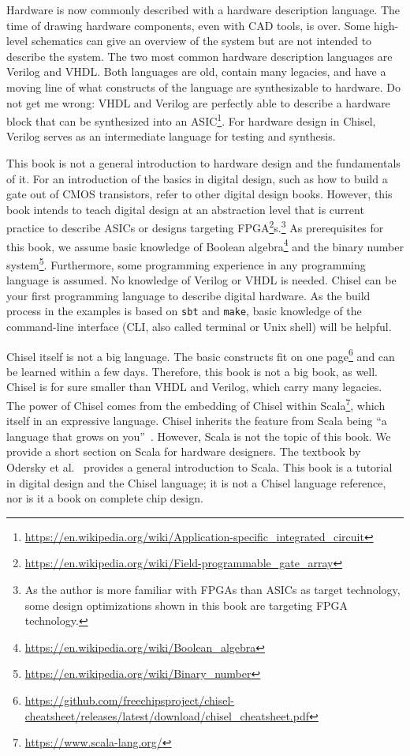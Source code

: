 \documentclass[%
    10pt,
    headinclude, footexclude,
    openright, %
    notitlepage,
    cleardoubleempty,
    headsepline,
    pointlessnumbers,
    bibtotoc, idxtotoc,
    ]{scrbook}
\newcommand{\code}[1]{{\small{\texttt{#1}}}}
\newcommand{\myref}[2]{\href{#1}{#2}}
\renewcommand{\myref}[2]{{#2}{\footnote{\url{#1}}}}
\begin{document}
Hardware is now commonly described with a hardware description language.
The time of drawing hardware components, even with CAD tools, is
over. Some high-level schematics can give an overview of the system but are
not intended to describe the system.
The two most common hardware description languages are Verilog and VHDL.
Both languages are old, contain many legacies, and have a moving line of what
constructs of the language are synthesizable to hardware.
Do not get me wrong: VHDL and Verilog are perfectly able to describe a hardware
block that can be synthesized into an
\myref{https://en.wikipedia.org/wiki/Application-specific_integrated_circuit}{ASIC}.
For hardware design in Chisel, Verilog serves as an intermediate language
for testing and synthesis.

This book is not a general introduction to hardware design and the fundamentals of it.
For an introduction of the basics in digital design, such as how to build a gate out of
CMOS transistors, refer to other digital design books.
However, this book intends to teach digital design at an abstraction level that is
current practice to describe ASICs or designs targeting
\myref{https://en.wikipedia.org/wiki/Field-programmable_gate_array}{FPGA}s.\footnote{As the author is more familiar with FPGAs
than ASICs as target technology, some design optimizations shown in this book are
targeting FPGA technology.}
As prerequisites for this book, we assume basic knowledge of
\myref{https://en.wikipedia.org/wiki/Boolean_algebra}{Boolean algebra} and the
\myref{https://en.wikipedia.org/wiki/Binary_number}{binary number system}.
Furthermore, some programming experience in any programming language
is assumed. No knowledge of Verilog or VHDL is needed.
Chisel can be your first programming language to describe digital hardware.
As the build process in the examples is based on \code{sbt} and \code{make},
basic knowledge of the command-line interface (CLI, also called terminal or
Unix shell) will be helpful.

Chisel itself is not a big language. The basic constructs fit on
\myref{https://github.com/freechipsproject/chisel-cheatsheet/releases/latest/download/chisel_cheatsheet.pdf}{one page}
and can be learned within a few days.
Therefore, this book is not a big book, as well.
Chisel is for sure smaller than VHDL and Verilog, which carry many legacies.
The power of Chisel comes from the embedding of Chisel within
\myref{https://www.scala-lang.org/}{Scala}, which itself in an expressive language.
Chisel inherits the feature from Scala being ``a language that grows on you''~\cite{Scala}.
However, Scala is not the topic of this book.
We provide a short section on Scala for hardware designers.
The textbook by Odersky et al.~\cite{Scala} provides a general introduction
to Scala.
This book is a tutorial in digital design and the Chisel language; it is not
a Chisel language reference, nor is it a book on complete chip design.
\end{document}
